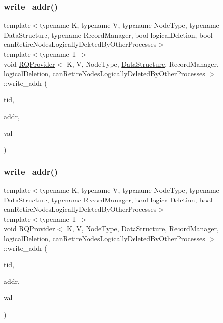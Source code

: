 \mbox{\label{classRQProvider_a2b627a253e65ffdbba9815d0ac3236cb}} 
\subsubsection{\texorpdfstring{write\+\_\+addr()}{write\_addr()}\hspace{0.1cm}{\footnotesize\ttfamily [2/5]}}
{\footnotesize\ttfamily template$<$typename K, typename V, typename Node\+Type, typename Data\+Structure, typename Record\+Manager, bool logical\+Deletion, bool can\+Retire\+Nodes\+Logically\+Deleted\+By\+Other\+Processes$>$ \\
template$<$typename T $>$ \\
void \hyperlink{classRQProvider}{R\+Q\+Provider}$<$ K, V, Node\+Type, \hyperlink{classDataStructure}{Data\+Structure}, Record\+Manager, logical\+Deletion, can\+Retire\+Nodes\+Logically\+Deleted\+By\+Other\+Processes $>$\+::write\+\_\+addr (\begin{DoxyParamCaption}\item[{const int}]{tid,  }\item[{T volatile $\ast$const}]{addr,  }\item[{const T}]{val }\end{DoxyParamCaption})\hspace{0.3cm}{\ttfamily [inline]}}

\mbox{\label{classRQProvider_a2b627a253e65ffdbba9815d0ac3236cb}} 
\subsubsection{\texorpdfstring{write\+\_\+addr()}{write\_addr()}\hspace{0.1cm}{\footnotesize\ttfamily [3/5]}}
{\footnotesize\ttfamily template$<$typename K, typename V, typename Node\+Type, typename Data\+Structure, typename Record\+Manager, bool logical\+Deletion, bool can\+Retire\+Nodes\+Logically\+Deleted\+By\+Other\+Processes$>$ \\
template$<$typename T $>$ \\
void \hyperlink{classRQProvider}{R\+Q\+Provider}$<$ K, V, Node\+Type, \hyperlink{classDataStructure}{Data\+Structure}, Record\+Manager, logical\+Deletion, can\+Retire\+Nodes\+Logically\+Deleted\+By\+Other\+Processes $>$\+::write\+\_\+addr (\begin{DoxyParamCaption}\item[{const int}]{tid,  }\item[{T volatile $\ast$const}]{addr,  }\item[{const T}]{val }\end{DoxyParamCaption})\hspace{0.3cm}{\ttfamily [inline]}}

